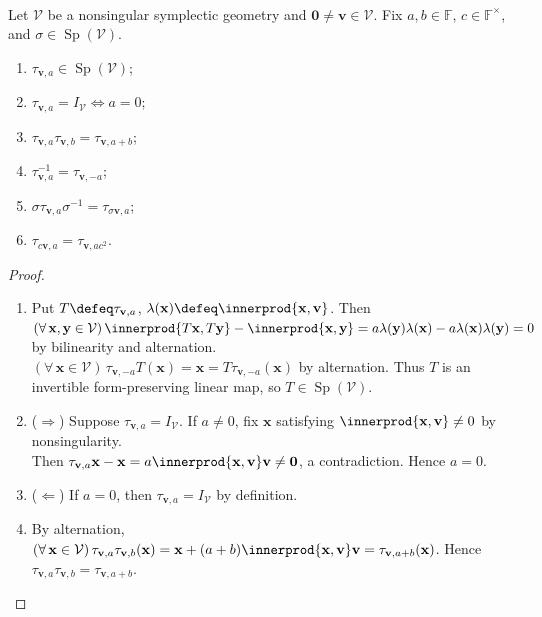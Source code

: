 \begin{proposition} \label{prop:symplectic-transvection-properties} \\
Let $\mathcal{V}$ be a nonsingular symplectic geometry and $\mathbf{0}\neq\mathbf{v}\in\mathcal{V}$. Fix $a,b\in\mathbb{F}$, $c\in\mathbb{F}^{\times}$, and $\sigma\in\operatorname{Sp}(\mathcal{V})$.
\begin{enumerate}[label=(\roman*)]
\setlength{\itemsep}{0pt}
\item $\tau_{\mathbf{v},a}\in\operatorname{Sp}(\mathcal{V})$;
\item $\tau_{\mathbf{v},a}=I_{\mathcal{V}}\Longleftrightarrow a=0$;
\item $\tau_{\mathbf{v},a}\tau_{\mathbf{v},b}=\tau_{\mathbf{v},a+b}$;
\item $\tau_{\mathbf{v},a}^{-1}=\tau_{\mathbf{v},-a}$;
\item $\sigma\tau_{\mathbf{v},a}\sigma^{-1}=\tau_{\sigma\mathbf{v},a}$;
\item $\tau_{c\mathbf{v},a}=\tau_{\mathbf{v},ac^2}$.
\end{enumerate}
\begin{proof}
\begin{enumerate}[label=(\roman*)]
\setlength{\itemsep}{0pt}
\item[$(i)$] Put $T\defeq\tau_{\mathbf{v},a}$, $\lambda(\mathbf{x})\defeq\innerprod{\mathbf{x},\mathbf{v}}$. Then $(\forall\,\mathbf{x},\mathbf{y}\in\mathcal{V})\,\innerprod{T\mathbf{x},T\mathbf{y}}-\innerprod{\mathbf{x},\mathbf{y}}=a\lambda(\mathbf{y})\lambda(\mathbf{x})-a\lambda(\mathbf{x})\lambda(\mathbf{y})=0$ by bilinearity and alternation.\\
$(\forall\,\mathbf{x}\in\mathcal{V})\,\tau_{\mathbf{v},-a}T(\mathbf{x})=\mathbf{x}=T\tau_{\mathbf{v},-a}(\mathbf{x})$ by alternation. Thus $T$ is an invertible form-preserving linear map, so $T\in\operatorname{Sp}(\mathcal{V})$.
\item[$(ii)$] ($\Rightarrow$) Suppose $\tau_{\mathbf{v},a}=I_{\mathcal{V}}$. If $a\neq0$, fix $\mathbf{x}$ satisfying $\innerprod{\mathbf{x},\mathbf{v}}\neq0$ by nonsingularity.\\
Then $\tau_{\mathbf{v},a}\mathbf{x}-\mathbf{x}=a\innerprod{\mathbf{x},\mathbf{v}}\mathbf{v}\neq\mathbf{0}$, a contradiction. Hence $a=0$.
\item[$(ii)$] ($\Leftarrow$) If $a=0$, then $\tau_{\mathbf{v},a}=I_{\mathcal{V}}$ by definition.
\item[$(iii)$] By alternation, $(\forall\,\mathbf{x}\in\mathcal{V})\,\tau_{\mathbf{v},a}\tau_{\mathbf{v},b}(\mathbf{x})=\mathbf{x}+(a+b)\innerprod{\mathbf{x},\mathbf{v}}\mathbf{v}=\tau_{\mathbf{v},a+b}(\mathbf{x})$. Hence $\tau_{\mathbf{v},a}\tau_{\mathbf{v},b}=\tau_{\mathbf{v},a+b}$.

\end{enumerate}
\end{proof}
\end{proposition}
